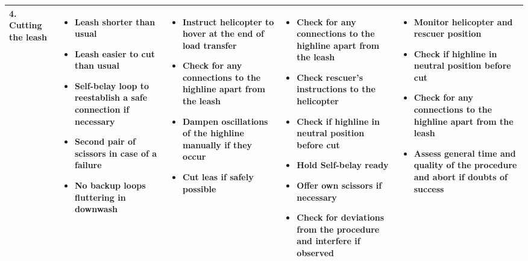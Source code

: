 \documentclass[a4paper,10pt]{scrartcl}
\begin{document}
\begin{landscape}
\begin{longtable}{|p{4cm}|p{4cm}|p{4cm}|p{4cm}|p{4cm}|}
 4. Cutting the leash &
 \begin{itemize}
    \item Leash shorter than usual
    \item Leash easier to cut than usual
    \item Self-belay loop to reestablish a safe connection if necessary
    \item Second pair of scissors in case of a failure
    \item No backup loops fluttering in downwash
  \end{itemize} & 
   \begin{itemize}
    \item Instruct helicopter to hover at the end of load transfer
    \item Check for any connections to the highline apart from the leash
    \item Dampen oscillations of the highline manually if they occur
    \item Cut leas if safely possible
  \end{itemize} & 
   \begin{itemize}
    \item Check for any connections to the highline apart from the leash
    \item Check rescuer's instructions to the helicopter
    \item Check if highline in neutral position before cut
    \item Hold Self-belay ready
    \item Offer own scissors if necessary
    \item Check for deviations from the procedure and interfere if observed
  \end{itemize} & 
   \begin{itemize}
    \item Monitor helicopter and rescuer position
    \item Check if highline in neutral position before cut
    \item Check for any connections to the highline apart from the leash
    \item Assess general time and quality of the procedure and abort if doubts of success
  \end{itemize} \\
  \hline


\end{longtable}
\end{landscape}
\end{document}
